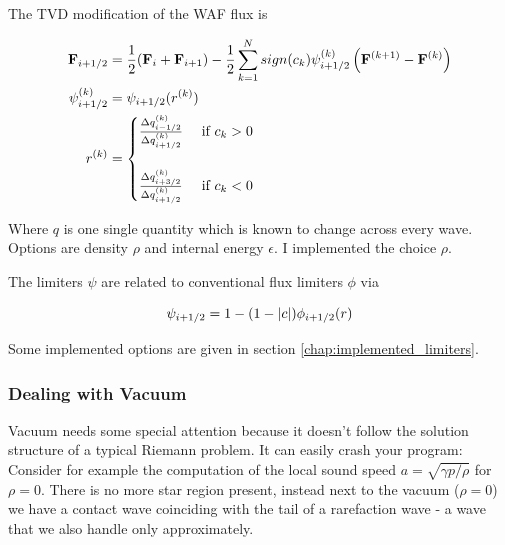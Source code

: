 The TVD modification of the WAF flux is


\begin{align}
	\F_{i + \half} 
		&= \frac{1}{2} (\F_i + \F_{i+1}) - \frac{1}{2} \sum\limits_{k = 1}^{N} sign(c_k) \psi_{i+\half}^{(k)} \left (\F^{(k+1)} - \F^{(k)} \right) \\
	\psi_{i+\half}^{(k)}
		&= \psi_{i+\half}(r^{(k)}) \\
	r^{(k)} &=
		\begin{cases}
			\frac{\Delta q_{i-\half}^{(k)}}{\Delta q_{i+\half}^{(k)}}	& \text{ if } c_k > 0 \\[2em]
			\frac{\Delta q_{i+3/2}^{(k)}}{\Delta q_{i+\half}^{(k)}}	& \text{ if } c_k < 0 \\		
		\end{cases}
\end{align}

Where $q$ is one single quantity which is known to change across every wave.
Options are density $\rho$ and internal energy $\epsilon$.
I implemented the choice $\rho$.

The limiters $\psi$ are related to conventional flux limiters $\phi$ via

\begin{equation}
	\psi_{i+1/2} = 1 - ( 1 - |c|) \phi_{i+1/2}(r)
\end{equation}

Some implemented options are given in section \ref{chap:implemented_limiters}.












\subsubsection{Dealing with Vacuum}\label{chap:hydro-WAF-vacuum}


Vacuum needs some special attention because it doesn't follow the solution structure of a typical Riemann problem.
It can easily crash your program:
Consider for example the computation of the local sound speed $a = \sqrt{\gamma p/\rho}$ for $\rho = 0$.
There is no more star region present, instead next to the vacuum ($\rho = 0$) we have a contact wave coinciding with the tail of a rarefaction wave - a wave that we also handle only approximately.

